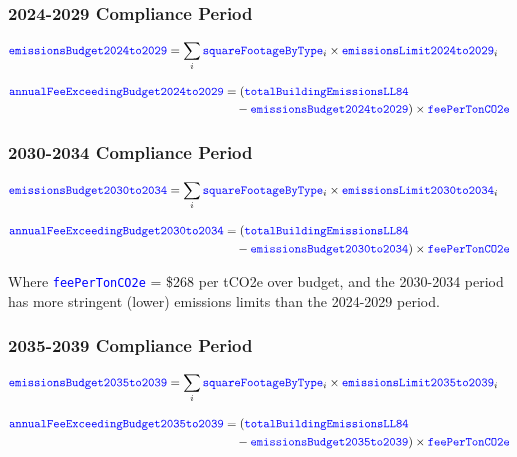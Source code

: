\documentclass{article}
\newcommand{\code}[1]{\textcolor{blue}{\texttt{#1}}}
\begin{document}
\subsubsection{2024-2029 Compliance Period}
\begin{align}
\code{emissionsBudget2024to2029} &= \sum_{i} \code{squareFootageByType}_i \times \code{emissionsLimit2024to2029}_i
\end{align}

\begin{align}
\code{annualFeeExceedingBudget2024to2029} &= (\code{totalBuildingEmissionsLL84} \nonumber\\
&\quad - \code{emissionsBudget2024to2029}) \times \code{feePerTonCO2e}
\end{align}

\subsubsection{2030-2034 Compliance Period}
\begin{align}
\code{emissionsBudget2030to2034} &= \sum_{i} \code{squareFootageByType}_i \times \code{emissionsLimit2030to2034}_i
\end{align}

\begin{align}
\code{annualFeeExceedingBudget2030to2034} &= (\code{totalBuildingEmissionsLL84} \nonumber\\
&\quad - \code{emissionsBudget2030to2034}) \times \code{feePerTonCO2e}
\end{align}

Where \code{feePerTonCO2e} = \$268 per tCO2e over budget, and the 2030-2034 period has more stringent (lower) emissions limits than the 2024-2029 period.

\subsubsection{2035-2039 Compliance Period}
\begin{align}
\code{emissionsBudget2035to2039} &= \sum_{i} \code{squareFootageByType}_i \times \code{emissionsLimit2035to2039}_i
\end{align}

\begin{align}
\code{annualFeeExceedingBudget2035to2039} &= (\code{totalBuildingEmissionsLL84} \nonumber\\
&\quad - \code{emissionsBudget2035to2039}) \times \code{feePerTonCO2e}
\end{align}
\end{document}
